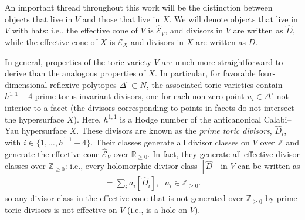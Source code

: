 \documentclass[11pt,dvipsnames]{article}
\theoremstyle{definition}
\begin{document}
An important thread throughout this work will be the distinction between objects that live in $V$ and those that live in $X$. We will denote objects that live in $V$ with hats: i.e., the effective cone of $V$ is $\hat{\mathcal{E}}_V$, and divisors in $V$ are written as $\hat{D}$, while the effective cone of $X$ is $\mathcal{E}_X$ and divisors in $X$ are written as $D$. 

In general, properties of the toric variety $V$ are much more straightforward to derive than the analogous properties of $X$. In particular, for favorable four-dimensional reflexive polytopes $\Delta^\circ \subset N$, the associated toric varieties contain $h^{1,1} + 4$ prime torus-invariant divisors, one for each non-zero point $u_i \in \Delta^\circ$ not interior to a facet (the divisors corresponding to points in facets do not intersect the hypersurface $X$). Here, $h^{1,1}$ is a Hodge number of the anticanonical Calabi--Yau hypersurface $X$. These divisors are known as the \textit{prime toric divisors}, $\hat{D}_i$, with $i \in \{1,\ldots, h^{1,1}+4\}$. Their classes generate all divisor classes on $V$ over $\mathbb{Z}$ and generate the effective cone $\hat{\mathcal{E}}_V$ over $\mathbb{R}_{\geq 0}$. In fact, they generate all effective divisor classes over $\mathbb{Z}_{\geq 0}$: i.e., every holomorphic divisor class $[\hat{D}]$ in $V$ can be written as
\begin{align}
    [\hat{D}] = \sum_i a_i [\hat{D}_i], \ \ \ a_i \in \mathbb{Z}_{\geq 0}.
\end{align}
so any divisor class in the effective cone that is not generated over $\mathbb{Z}_{\geq 0}$ by prime toric divisors is not effective on $V$ (i.e., is a hole on $V$). 
\end{document}
